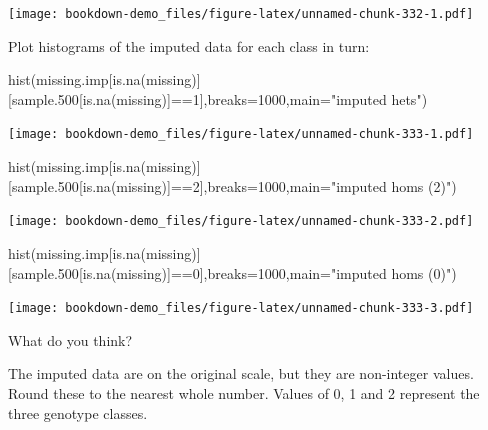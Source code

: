 \documentclass[
]{book}
\newenvironment{Shaded}{\begin{snugshade}}{\end{snugshade}}
\newcommand{\AttributeTok}[1]{\textcolor[rgb]{0.77,0.63,0.00}{#1}}
\newcommand{\DecValTok}[1]{\textcolor[rgb]{0.00,0.00,0.81}{#1}}
\newcommand{\FloatTok}[1]{\textcolor[rgb]{0.00,0.00,0.81}{#1}}
\newcommand{\FunctionTok}[1]{\textcolor[rgb]{0.00,0.00,0.00}{#1}}
\newcommand{\NormalTok}[1]{#1}
\newcommand{\SpecialCharTok}[1]{\textcolor[rgb]{0.00,0.00,0.00}{#1}}
\newcommand{\StringTok}[1]{\textcolor[rgb]{0.31,0.60,0.02}{#1}}
\begin{document}
\texttt{[image: bookdown-demo\_files/figure-latex/unnamed-chunk-332-1.pdf]}

Plot histograms of the imputed data for each class in turn:

\begin{Shaded}
\begin{Highlighting}[]
\FunctionTok{hist}\NormalTok{(missing.imp[}\FunctionTok{is.na}\NormalTok{(missing)][sample}\FloatTok{.500}\NormalTok{[}\FunctionTok{is.na}\NormalTok{(missing)]}\SpecialCharTok{==}\DecValTok{1}\NormalTok{],}\AttributeTok{breaks=}\DecValTok{1000}\NormalTok{,}\AttributeTok{main=}\StringTok{"imputed hets"}\NormalTok{)}
\end{Highlighting}
\end{Shaded}

\texttt{[image: bookdown-demo\_files/figure-latex/unnamed-chunk-333-1.pdf]}

\begin{Shaded}
\begin{Highlighting}[]
\FunctionTok{hist}\NormalTok{(missing.imp[}\FunctionTok{is.na}\NormalTok{(missing)][sample}\FloatTok{.500}\NormalTok{[}\FunctionTok{is.na}\NormalTok{(missing)]}\SpecialCharTok{==}\DecValTok{2}\NormalTok{],}\AttributeTok{breaks=}\DecValTok{1000}\NormalTok{,}\AttributeTok{main=}\StringTok{"imputed homs (2)"}\NormalTok{)}
\end{Highlighting}
\end{Shaded}

\texttt{[image: bookdown-demo\_files/figure-latex/unnamed-chunk-333-2.pdf]}

\begin{Shaded}
\begin{Highlighting}[]
\FunctionTok{hist}\NormalTok{(missing.imp[}\FunctionTok{is.na}\NormalTok{(missing)][sample}\FloatTok{.500}\NormalTok{[}\FunctionTok{is.na}\NormalTok{(missing)]}\SpecialCharTok{==}\DecValTok{0}\NormalTok{],}\AttributeTok{breaks=}\DecValTok{1000}\NormalTok{,}\AttributeTok{main=}\StringTok{"imputed homs (0)"}\NormalTok{) }
\end{Highlighting}
\end{Shaded}

\texttt{[image: bookdown-demo\_files/figure-latex/unnamed-chunk-333-3.pdf]}

What do you think?

The imputed data are on the original scale, but they are non-integer values. Round these to the nearest whole number. Values of 0, 1 and 2 represent the three genotype classes.
\end{document}
